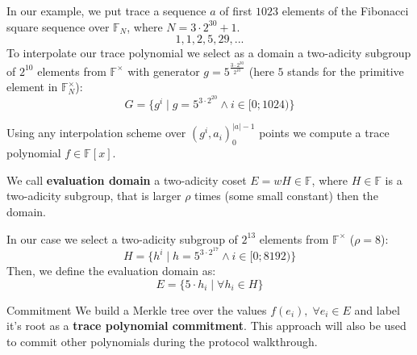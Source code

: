 \documentclass{zkdl-presentation-template}
\begin{document}
\begin{frame}
    \begin{example}
        In our example, we put trace a sequence $a$ of first $1023$ elements of the Fibonacci square sequence over $\mathbb{F}_N$, where $N=3\cdot 2^{30} + 1$.
        \begin{equation*}
        1, 1, 2, 5, 29, ...
        \end{equation*}
        To interpolate our trace polynomial we select as a domain a two-adicity subgroup of $2^{10}$ elements from $\mathbb{F}^\times$ with generator $g = 5^{\frac{3\cdot 2^{30}}{2^{10}}}$ (here $5$ stands for the primitive element in $\mathbb{F}^\times_N$):
        \begin{equation*}
        G = \{g^i \;|\; g = 5^{3\cdot 2^{20}} \land i \in [0;1024) \}
        \end{equation*}
    \end{example}
\end{frame}

\begin{frame}
    Using any interpolation scheme over $(g^i, a_i)_0^{|a| - 1}$ points we compute a trace polynomial $f \in \mathbb{F}[x]$.
\end{frame}

\begin{frame}
    \begin{definition}
        We call \textbf{evaluation domain} a two-adicity coset $E = wH\in \mathbb{F}$, where $H \in \mathbb{F}$ is a two-adicity subgroup, that is larger $\rho$ times (some small constant) then the domain. 
    \end{definition}

    \begin{example}
        In our case we select a two-adicity subgroup of $2^{13}$ elements from $\mathbb{F}^\times$ ($\rho = 8$): 
        \begin{equation*}
        H = \{h^i \;|\; h = 5^{3\cdot 2^{17}} \land i \in [0;8192) \}
        \end{equation*}
        Then, we define the evaluation domain as:
        \begin{equation*}
        E = \{5\cdot h_i \;|\; \forall h_i \in H\}  
        \end{equation*}
        \end{example}
\end{frame}


\begin{frame}{Commitment}
    We build a Merkle tree over the values $f(e_i),\; \forall e_i \in E$ and label it's root as a \textbf{trace polynomial commitment}. This approach will also be used to commit other polynomials during the protocol walkthrough.    
\end{frame}
\end{document}
